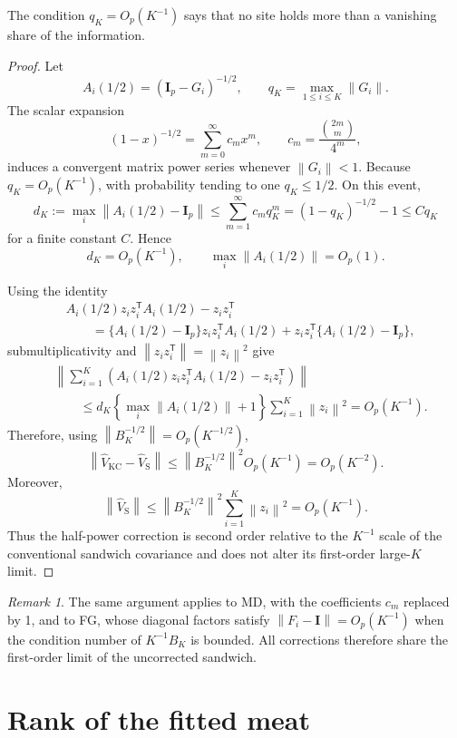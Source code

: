 \documentclass[12pt]{article}
\theoremstyle{remark}
\newtheorem{remark}[theorem]{Remark}
\numberwithin{equation}{section}
\newcommand{\trans}{\mathsf{T}}
\newcommand{\bI}{\mathbf I}
\newcommand{\norm}[1]{\left\lVert#1\right\rVert}
\begin{document}
The condition $q_K=O_p(K^{-1})$ says that no site holds more than a vanishing share
of the information.

\begin{proof}
Let
\[
A_i(1/2)
=
(\bI_p-G_i)^{-1/2},
\qquad
q_K=\max_{1\le i\le K}\norm{G_i}.
\]
The scalar expansion
\[
(1-x)^{-1/2}
=
\sum_{m=0}^{\infty}c_mx^m,
\qquad
c_m=\frac{\binom{2m}{m}}{4^m},
\]
induces a convergent matrix power series whenever \(\norm{G_i}<1\).
Because \(q_K=O_p(K^{-1})\), with probability tending to one
\(q_K\le1/2\). On this event,
\[
d_K
:=
\max_i\norm{A_i(1/2)-\bI_p}
\le
\sum_{m=1}^{\infty}c_mq_K^m
=
(1-q_K)^{-1/2}-1
\le
Cq_K
\]
for a finite constant \(C\). Hence
\[
d_K=O_p(K^{-1}),
\qquad
\max_i\norm{A_i(1/2)}=O_p(1).
\]

Using the identity
\begin{align*}
&A_i(1/2)z_i z_i^{\trans}A_i(1/2)-z_i z_i^{\trans}\\
&\qquad=
\{A_i(1/2)-\bI_p\}z_i z_i^{\trans}A_i(1/2)
+
z_i z_i^{\trans}\{A_i(1/2)-\bI_p\},
\end{align*}
submultiplicativity and
\(\norm{z_i z_i^{\trans}}=\norm{z_i}^2\) give
\begin{align*}
&\left\|
\sum_{i=1}^K
\left(
A_i(1/2)z_i z_i^{\trans}A_i(1/2)-z_i z_i^{\trans}
\right)
\right\|\\
&\qquad\le
 d_K\left\{\max_i\norm{A_i(1/2)}+1\right\}
\sum_{i=1}^K\norm{z_i}^2
=
O_p(K^{-1}).
\end{align*}
Therefore, using \(\norm{B_K^{-1/2}}=O_p(K^{-1/2})\),
\[
\left\|
\widehat V_{\mathrm{KC}}-\widehat V_{\mathrm{S}}
\right\|
\le
\norm{B_K^{-1/2}}^2 O_p(K^{-1})
=
O_p(K^{-2}).
\]
Moreover,
\[
\norm{\widehat V_{\mathrm{S}}}
\le
\norm{B_K^{-1/2}}^2
\sum_{i=1}^K\norm{z_i}^2
=
O_p(K^{-1}).
\]
Thus the half-power correction is second order relative to the
\(K^{-1}\) scale of the conventional sandwich covariance and does not
alter its first-order large-\(K\) limit.
\end{proof}

\begin{remark}
The same argument applies to MD, with the coefficients $c_m$ replaced by 1, and
to FG, whose diagonal factors satisfy $\norm{F_i-\bI}=O_p(K^{-1})$ when the
condition number of $K^{-1}B_K$ is bounded. All corrections therefore share the
first-order limit of the uncorrected sandwich.
\end{remark}

\section{Rank of the fitted meat}
\label{app:E}
\end{document}
